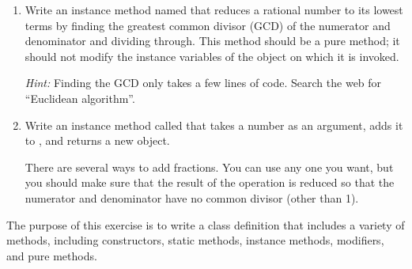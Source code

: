 \begin{exercise}
\begin{enumerate}
\item Write an instance method named  that reduces a rational number to its lowest terms by finding the greatest common divisor (GCD) of the numerator and denominator and dividing through.
This method should be a pure method; it should not modify the instance variables of the object on which it is invoked.

{\it Hint:} Finding the GCD only takes a few lines of code.
Search the web for ``Euclidean algorithm''.

\item Write an instance method called  that takes a  number as an argument, adds it to , and returns a new  object.

There are several ways to add fractions.
You can use any one you want, but you should make sure that the result of the operation is reduced so that the numerator and denominator have no common divisor (other than 1).

\end{enumerate}

The purpose of this exercise is to write a class definition that includes a variety of methods, including constructors, static methods, instance methods, modifiers, and pure methods.

\end{exercise}
